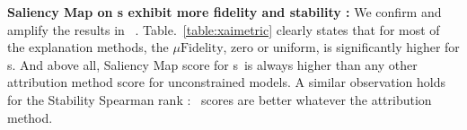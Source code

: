 \textbf{Saliency Map on \otnn s exhibit more fidelity and stability : } 
We confirm and amplify the results in ~\cite{felHowGood22}. Table.~\ref{table:xaimetric} clearly states that 
for most of the explanation methods, the $\mu\text{Fidelity}$,  zero or uniform, is significantly higher for \otnn s. And above all, Saliency Map score for \otnn s~is always higher than any other attribution method score for unconstrained models.
A similar observation 
holds for 
the Stability Spearman rank
: \otnn~scores are better whatever the attribution method.



